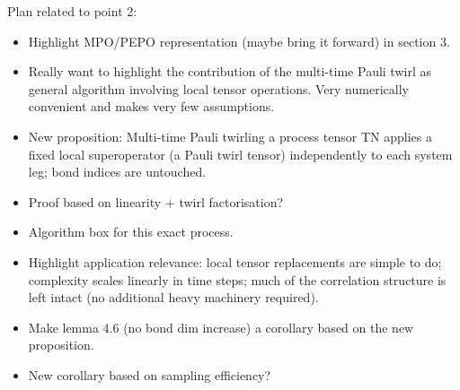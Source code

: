 \documentclass{article}
\begin{document}
Plan related to point 2:
\begin{itemize}
    \item Highlight MPO/PEPO representation (maybe bring it forward) in section 3.
    \item Really want to highlight the contribution of the multi-time Pauli twirl as general algorithm involving local tensor operations. Very numerically convenient and makes very few assumptions.
    \item New proposition: Multi-time Pauli twirling a process tensor TN applies a fixed local superoperator (a Pauli twirl tensor) independently to each system leg; bond indices are untouched.
    \item Proof based on linearity + twirl factorisation?
    \item Algorithm box for this exact process.
    \item Highlight application relevance: local tensor replacements are simple to do; complexity scales linearly in time steps; much of the correlation structure is left intact (no additional heavy machinery required).
    \item Make lemma 4.6 (no bond dim increase) a corollary based on the new proposition. 
    \item New corollary based on sampling efficiency?
\end{itemize}

\end{document}
